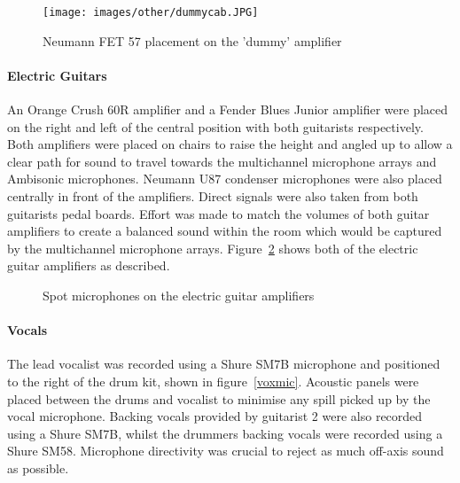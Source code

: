 				\begin{figure}[ht]
				\begin{center}
					\texttt{[image: images/other/dummycab.JPG]}
					\caption{Neumann FET 57 placement on the 'dummy' amplifier}
					\label{drums}
				\end{center}
				\end{figure}

			\paragraph{Electric Guitars}
				An Orange Crush 60R amplifier and a Fender Blues Junior amplifier were placed on the right and left of the central position with both guitarists respectively. Both amplifiers were placed on chairs to raise the height and angled up to allow a clear path for sound to travel towards the multichannel microphone arrays and Ambisonic microphones. Neumann U87 condenser microphones were also placed centrally in front of the amplifiers. Direct signals were also taken from both guitarists pedal boards. Effort was made to match the volumes of both guitar amplifiers to create a balanced sound within the room which would be captured by the multichannel microphone arrays. Figure~\ref{guitarAmps} shows both of the electric guitar amplifiers as described.\\

				\begin{figure}
					\centering
					\caption{Spot microphones on the electric guitar amplifiers}
					\label{guitarAmps}
				\end{figure}
				

			\paragraph{Vocals}
				The lead vocalist was recorded using a Shure SM7B microphone and positioned to the right of the drum kit, shown in figure~\ref{voxmic}. Acoustic panels were placed between the drums and vocalist to minimise any spill picked up by the vocal microphone. Backing vocals provided by guitarist 2 were also recorded using a Shure SM7B, whilst the drummers backing vocals were recorded using a Shure SM58. Microphone directivity was crucial to reject as much off-axis sound as possible.\\

